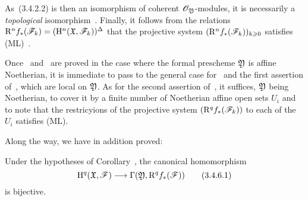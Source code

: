 \begin{env}[3.4.5]
As~(3.4.2.2) is then an isomorphism of coherent $\mathscr{O}_\mathfrak{Y}$-modules, it is necessarily a \emph{topological} isomorphism~.
Finally, it follows from the relations $\mathrm{R}^n f_*(\mathscr{F}_k)=(\mathrm{H}^n(\mathfrak{X},\mathscr{F}_k))^\Delta$ that the projective system $(\mathrm{R}^n f_*(\mathscr{F}_k))_{k\geqslant 0}$ satisfies (ML)~.

Once~ and~ are proved in the case where the formal prescheme $\mathfrak{Y}$ is affine Noetherian, it is immediate to pass to the general case for~ and the first assertion of~, which are local on $\mathfrak{Y}$.
As for the second assertion of~, it suffices, $\mathfrak{Y}$ being Noetherian, to cover it by a finite number of Noetherian affine open sets $U_i$ and to note that the restricyions of the projective system $(\mathrm{R}^q f_*(\mathscr{F}_k))$ to each of the $U_i$ satisfies (ML).
\end{env}

Along the way, we have in addition proved:
\begin{cor}[3.4.6]
\label{3.3.4.6}
Under the hypotheses of Corollary~, the canonical homomorphism
\[
\label{3.3.4.6.1}
  \HH^q(\fk{X},\sh{F})\to\Gamma(\fk{Y},\RR^q f_*(\sh{F}))
  \tag{3.4.6.1}
\]
is bijective.
\end{cor}

